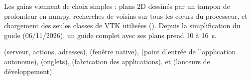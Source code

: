 Les gains viennent de choix simples : plans 2D dessinés par un tampon de profondeur en numpy, recherches de voisins
sur tous les cœurs du processeur, et chargement des seules classes de VTK utilisées (). Depuis
la simplification du guide (06/11/2026), un guide complet avec ses plans prend 10 à 16~s.

\begin{danslecode}
 (serveur, actions, adresses),  (fenêtre native),
 (point d'entrée de l'application autonome), 
(onglets),  (fabrication des applications),  et
 (lanceurs de développement).
\end{danslecode}
